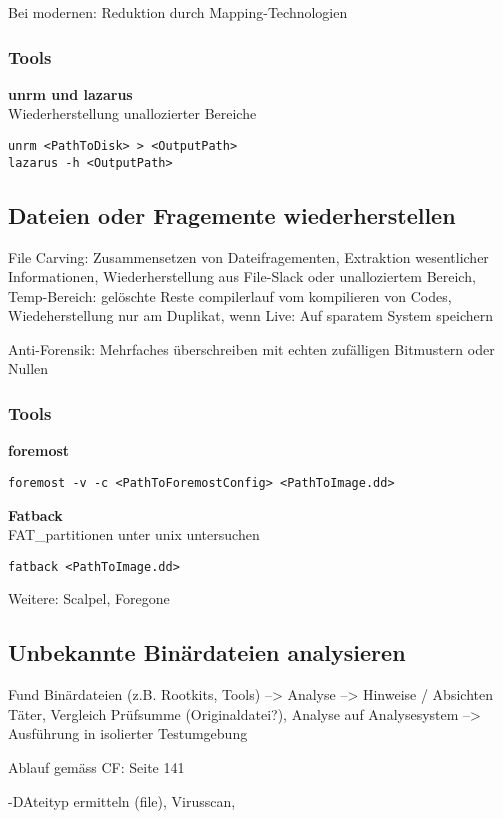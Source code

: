 Bei modernen: Reduktion durch Mapping-Technologien

\subsubsection{Tools}
\textbf{unrm und lazarus} \\
Wiederherstellung unallozierter Bereiche
\begin{verbatim}
unrm <PathToDisk> > <OutputPath>
lazarus -h <OutputPath>
\end{verbatim}


\subsection{Dateien oder Fragemente wiederherstellen}
File Carving: Zusammensetzen von Dateifragementen, Extraktion wesentlicher Informationen, Wiederherstellung aus File-Slack oder unalloziertem Bereich, 
Temp-Bereich: gelöschte Reste compilerlauf vom kompilieren von Codes, Wiedeherstellung nur am Duplikat, wenn Live: Auf sparatem System speichern

Anti-Forensik: Mehrfaches überschreiben mit echten zufälligen Bitmustern oder Nullen

\subsubsection{Tools}
\textbf{foremost} \\
\begin{verbatim}
foremost -v -c <PathToForemostConfig> <PathToImage.dd>
\end{verbatim}


\textbf{Fatback}\\
FAT_partitionen unter unix untersuchen
\begin{verbatim}
fatback <PathToImage.dd>
\end{verbatim}

Weitere: Scalpel, Foregone

\subsection{Unbekannte Binärdateien analysieren}
Fund Binärdateien (z.B. Rootkits, Tools) --> Analyse --> Hinweise / Absichten Täter, Vergleich Prüfsumme (Originaldatei?), Analyse auf Analysesystem --> Ausführung in isolierter Testumgebung

Ablauf gemäss CF: Seite 141

-DAteityp ermitteln (file), Virusscan, 

